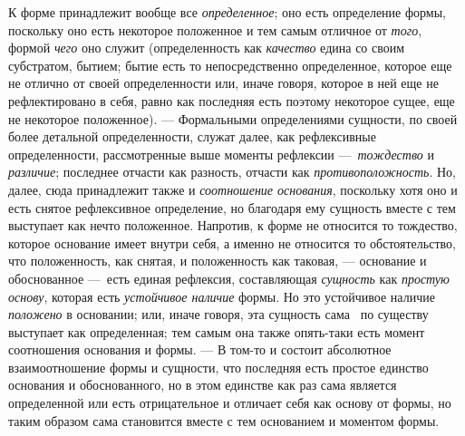 К форме принадлежит вообще все {\em определенное}; оно
есть определение формы, поскольку оно есть некоторое положенное и тем самым
отличное от {\em того}, формой
{\em чего} оно служит (определенность как
{\em качество} едина со своим субстратом, бытием; бытие
есть то непосредственно определенное, которое еще не отлично от своей
определенности или, иначе говоря, которое в ней еще не рефлектировано в
себя, равно как последняя есть поэтому некоторое сущее, еще не некоторое
положенное). — Формальными определениями сущности, по своей более детальной
определенности, служат далее, как рефлексивные определенности,
рассмотренные выше моменты рефлексии —~{\em тождество}
и {\em различие}; последнее отчасти как разность,
отчасти как {\em противоположность}. Но, далее, сюда
принадлежит также и {\em соотношение основания},
поскольку хотя оно и есть снятое рефлексивное определение, но благодаря ему
сущность вместе с тем выступает как нечто положенное. Напротив, к форме не
относится то тождество, которое основание имеет внутри себя, а именно не
относится то обстоятельство, что положенность, как снятая, и положенность
как таковая, — основание и обоснованное —~есть единая рефлексия,
составляющая {\em сущность} как
{\em простую основу}, которая есть
{\em устойчивое наличие} формы. Но это устойчивое
наличие {\em положено} в основании; или, иначе говоря,
эта сущность сама \ по существу выступает как определенная; тем самым она
также опять-таки есть момент соотношения основания и формы. — В том-то и
состоит абсолютное взаимоотношение формы и сущности, что последняя есть
простое единство основания и обоснованного, но в этом единстве как раз сама
является определенной или есть отрицательное и отличает себя как основу от
формы, но таким образом сама становится вместе с тем основанием и моментом
формы.

